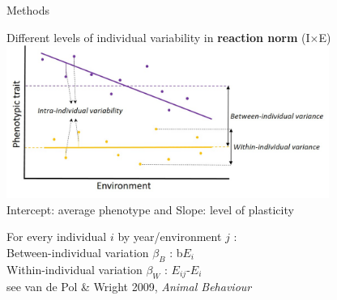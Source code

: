 \documentclass[compress]{beamer}
\begin{document}
\begin{frame}{Methods}


\vspace{0.3cm}
Different levels of individual variability in \textbf{reaction norm} (I$\times$E) \\
  \centering     
 \includegraphics[height = 5cm]{Chapter/variance.jpg} \\
 \small Intercept: average phenotype and Slope: level of plasticity \\
 
 \normalsize
 \vspace{0.2cm}
 \raggedright
For every individual $i$ by year/environment $j$ :\\
 Between-individual variation $\beta_B$ : b$E_i$ \\ 
 Within-individual variation $\beta_W$ :   $E_{ij}$-$E_i$ \\

\raggedleft
\tiny{see van de Pol \& Wright 2009, \textit{Animal Behaviour}}
\end{frame}
\end{document}
